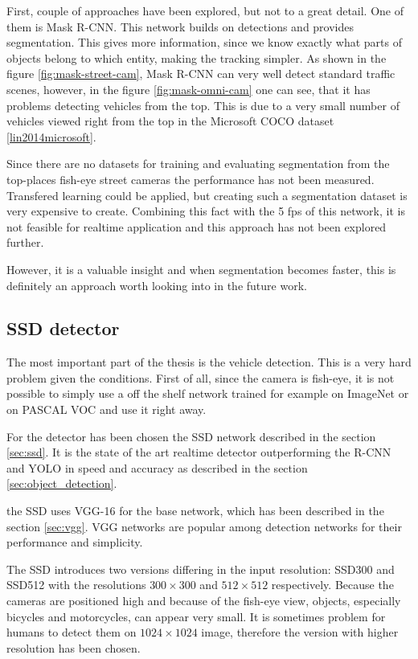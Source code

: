 \documentclass[a4paper,12pt,titlepage]{article}
\numberwithin{figure}{section}
\begin{document}
First, couple of approaches have been explored, but not to a great detail. One of them is  Mask R-CNN\cite{he2017mask}. This network builds on detections and provides segmentation. This gives more information, since we know exactly what parts of objects belong to which entity, making the tracking simpler. As shown in the figure \ref{fig:mask-street-cam}, Mask R-CNN can very well detect standard traffic scenes, however, in the figure \ref{fig:mask-omni-cam}  one can see, that it has problems detecting vehicles from the top. This is due to a very small number of vehicles viewed right from the top in the Microsoft COCO dataset \ref{lin2014microsoft}. 

Since there are no datasets for training and evaluating segmentation from the top-places fish-eye street cameras the performance has not been measured. Transfered learning could be applied, but creating such a segmentation dataset is very expensive to create. Combining this fact with the 5 fps of this network, it is not feasible for realtime application and this approach has not been explored further. 

However, it is a valuable insight and when segmentation becomes faster, this is definitely an approach worth looking into in the future work.

\subsection{SSD detector}
\label{sec:ssd-implementation}
The most important part of the thesis is the vehicle detection. This is a very hard problem given the conditions. First of all, since the camera is fish-eye, it is not possible to simply use a off the shelf network trained for example on ImageNet or on PASCAL VOC and use it right away. 

For the detector has been chosen the SSD network \cite{liu2016ssd} described in the section \ref{sec:ssd}. It is the state of the art realtime detector outperforming the R-CNN\cite{faster-rcnn} and YOLO\cite{redmon2016you} in speed and accuracy as described in the section \ref{sec:object_detection}. 

the SSD uses VGG-16 for the base network, which has been described in the section \ref{sec:vgg}. VGG networks are popular among detection networks for their performance and simplicity. 

The SSD introduces two versions differing in the input resolution: SSD300 and SSD512 with the resolutions $300 \times 300$ and $512 \times 512$ respectively. Because the cameras are positioned high and because of the fish-eye view, objects, especially bicycles and motorcycles, can appear very small. It is sometimes problem for humans to detect them on $1024 \times 1024$ image, therefore the version with higher resolution has been chosen. 
\end{document}
